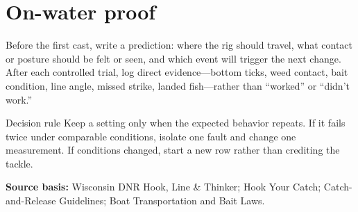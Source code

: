 {\section{On-water proof}
Before the first cast, write a prediction: where the rig should travel, what
contact or posture should be felt or seen, and which event will trigger the
next change. After each controlled trial, log direct evidence---bottom ticks,
weed contact, bait condition, line angle, missed strike, landed fish---rather
than ``worked'' or ``didn't work.''

\medskip
\riglog

\begin{telospanel}{Decision rule}
Keep a setting only when the expected behavior repeats. If it fails twice
under comparable conditions, isolate one fault and change one measurement.
If conditions changed, start a new row rather than crediting the tackle.
\end{telospanel}

\small\textbf{Source basis:} Wisconsin DNR Hook, Line \& Thinker; Hook Your
Catch; Catch-and-Release Guidelines; Boat Transportation and Bait Laws.
}
